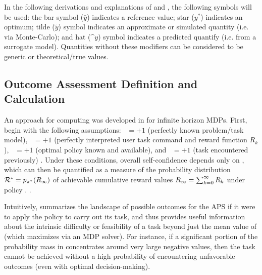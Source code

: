  In the following derivations and explanations of \xO{} and \xQ{}, the following symbols will be used: the bar symbol ($\bar{y}$) indicates a reference value; star ($y^*$) indicates an optimum; tilde ($\tilde{y}$) symbol indicates an approximate or simulated quantity (i.e. via Monte-Carlo); and hat ($\^{y}$) symbol indicates a predicted quantify (i.e. from a surrogate model). Quantities without these modifiers can be considered to be generic or theoretical/true values.

\subsection{Outcome Assessment Definition and Calculation} \label{sec:xO}
An approach for computing \xO{} was developed in \cite{Aitken2016-cv} for infinite horizon MDPs. First, begin with the following assumptions: \xM~$=+1$ (perfectly known problem/task model), \xI~$= +1$ (perfectly interpreted user task command and reward function $R_k$), \xQ~$=+1$ (optimal policy \piopt{} known and available), and \xP~$=+1$ (task encountered previously) . Under these conditions, overall self-confidence depends only on \xO{}, which can then be quantified as a measure of the probability distribution  $\mathcal{R}^* = p_{\pi^*}(R_{\infty})$ of achievable  cumulative reward values $R_{\infty}= \sum_{k=0}^{\infty}R_{k}$ under policy \piopt. . 

 Intuitively, \rwdopt{} summarizes the landscape of possible outcomes for the APS if it were to apply the policy \piopt{} to carry out its task, and thus provides useful information about the intrinsic difficulty or feasibility of a task beyond just the mean value of \ri{} (which \piopt{} maximizes via an MDP solver). For instance, if a significant portion of the probability mass in \rwdopt{} concentrates around very large negative values, then the task cannot be achieved without a high probability of encountering unfavorable outcomes (even with optimal decision-making). 

